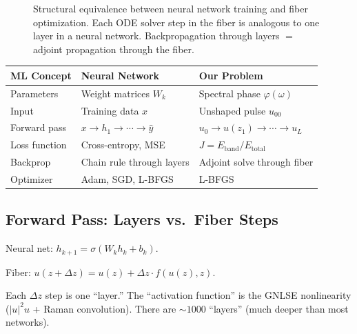 \documentclass[12pt,a4paper]{article}
\begin{document}
\begin{figure}[H]
\caption{Structural equivalence between neural network training and fiber optimization. Each ODE solver step in the fiber is analogous to one layer in a neural network. Backpropagation through layers $=$ adjoint propagation through the fiber.}
\label{fig:ml_analogy}
\end{figure}

\begin{center}
\begin{tabular}{lll}
\toprule
\textbf{ML Concept} & \textbf{Neural Network} & \textbf{Our Problem} \\
\midrule
Parameters & Weight matrices $W_k$ & Spectral phase $\varphi(\omega)$ \\
Input & Training data $x$ & Unshaped pulse $u_{00}$ \\
Forward pass & $x \to h_1 \to \cdots \to \hat{y}$ & $u_0 \to u(z_1) \to \cdots \to u_L$ \\
Loss function & Cross-entropy, MSE & $J = E_{\text{band}}/E_{\text{total}}$ \\
Backprop & Chain rule through layers & Adjoint solve through fiber \\
Optimizer & Adam, SGD, L-BFGS & L-BFGS \\
\bottomrule
\end{tabular}
\end{center}

\subsection{Forward Pass: Layers vs.\ Fiber Steps}

Neural net: $h_{k+1} = \sigma(W_k h_k + b_k)$.

Fiber: $u(z+\Delta z) = u(z) + \Delta z\cdot f(u(z), z)$.

Each $\Delta z$ step is one ``layer.'' The ``activation function'' is the GNLSE nonlinearity ($|u|^2 u$ + Raman convolution). There are ${\sim}1000$ ``layers'' (much deeper than most networks).
\end{document}
